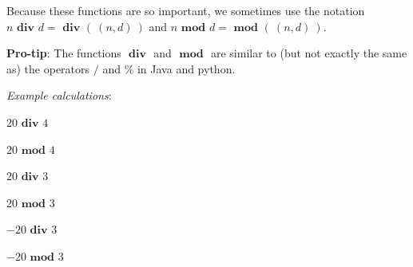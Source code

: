 \documentclass[12pt, oneside]{article}
\begin{document}
Because these functions are so important, we sometimes use the notation
$n \textbf{ div } d = \textbf{ div } ( ~(n,d)~)$ and $n \textbf{ mod } d = \textbf{ mod } (~(n,d)~)$.


{\bf Pro-tip}: The functions $\textbf{ div }$ and $\textbf{ mod }$ are similar to (but not exactly the same as) 
the operators $/$ and $\%$ in Java and python.

\vfill

{\it Example calculations}:

$20 \textbf{ div } 4$

\vspace{20pt}

$20 \textbf{ mod } 4$

\vspace{20pt}

$20 \textbf{ div } 3$

\vspace{20pt}

$20 \textbf{ mod } 3$

\vspace{20pt}

$-20 \textbf{ div } 3$

\vspace{20pt}

$-20 \textbf{ mod } 3$

\vfill \vfill
\end{document}

